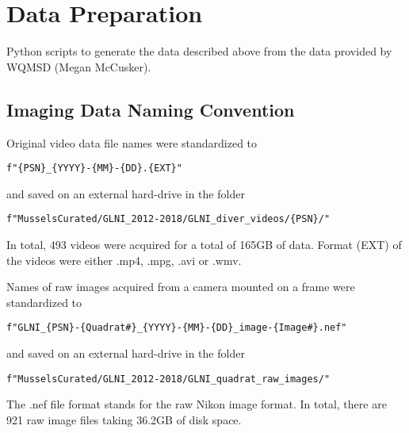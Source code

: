 \documentclass[11pt]{article} %
\begin{document}
\section{Data Preparation}

Python scripts to generate the data described above from the data provided by WQMSD (Megan McCusker).


\subsection{Imaging Data Naming Convention}
Original video data file names were standardized to
\begin{verbatim}
f"{PSN}_{YYYY}-{MM}-{DD}.{EXT}"
\end{verbatim}
and saved on an external hard-drive in the folder
\begin{verbatim}
f"MusselsCurated/GLNI_2012-2018/GLNI_diver_videos/{PSN}/"
\end{verbatim}
In total, 493 videos were acquired for a total of 165GB of data. Format (EXT) of the videos were either .mp4, .mpg, .avi or .wmv.

Names of raw images acquired from a camera mounted on a frame were standardized to
\begin{verbatim}
f"GLNI_{PSN}-{Quadrat#}_{YYYY}-{MM}-{DD}_image-{Image#}.nef"
\end{verbatim}
and saved on an external hard-drive in the folder
\begin{verbatim}
f"MusselsCurated/GLNI_2012-2018/GLNI_quadrat_raw_images/"
\end{verbatim}
The .nef file format stands for the raw Nikon image format. In total, there are 921 raw image files taking 36.2GB of disk space.
\end{document}

